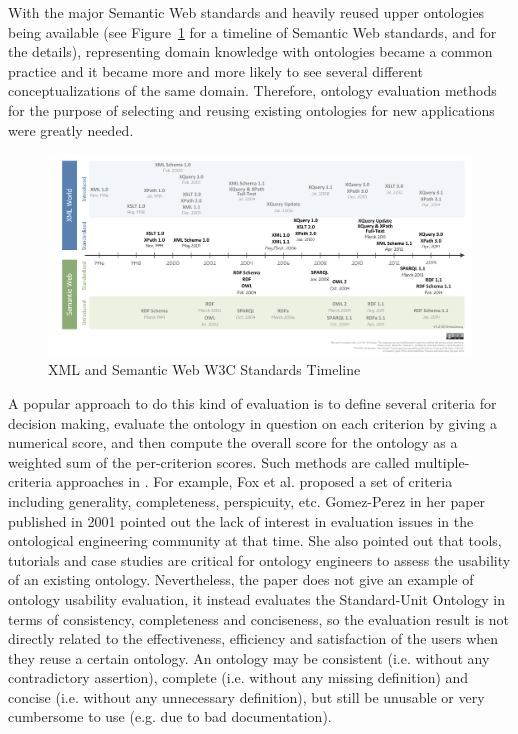 With the major Semantic Web standards and heavily reused upper ontologies being available (see Figure~\ref{fig:timeline} for a timeline of Semantic Web standards, and \cite{bikakis2013xml} for the details), representing domain knowledge with ontologies became a common practice and it became more and more likely to see several different conceptualizations of the same domain. Therefore, ontology evaluation methods for the purpose of selecting and reusing existing ontologies for new applications were greatly needed.

\begin{figure}
	\centering
	\includegraphics[width=\linewidth]{XMLSemanticWebW3CTimeline}
	\caption[XML and Semantic Web W3C Standards Timeline]{XML and Semantic Web W3C Standards Timeline}
	\label{fig:timeline}
\end{figure}

A popular approach to do this kind of evaluation is to define several criteria for decision making, evaluate the ontology in question on each criterion by giving a numerical score, and then compute the overall score for the ontology as a weighted sum of the per-criterion scores. Such methods are called multiple-criteria approaches in \cite{brank2005survey}. For example, Fox et al. \cite{fox1995organisation} proposed a set of criteria including generality, completeness, perspicuity, etc. Gomez-Perez in her paper \cite{gomez2001evaluation} published in 2001 pointed out the lack of interest in evaluation issues in the ontological engineering community at that time. She also pointed out that tools, tutorials and case studies are critical for ontology engineers to assess the usability of an existing ontology. Nevertheless, the paper does not give an example of ontology usability evaluation, it instead evaluates the Standard-Unit Ontology in terms of consistency, completeness and conciseness, so the evaluation result is not directly related to the effectiveness, efficiency and satisfaction of the users when they reuse a certain ontology. An ontology may be consistent (i.e. without any contradictory assertion), complete (i.e. without any missing definition) and concise (i.e. without any unnecessary definition), but still be unusable or very cumbersome to use (e.g. due to bad documentation).

